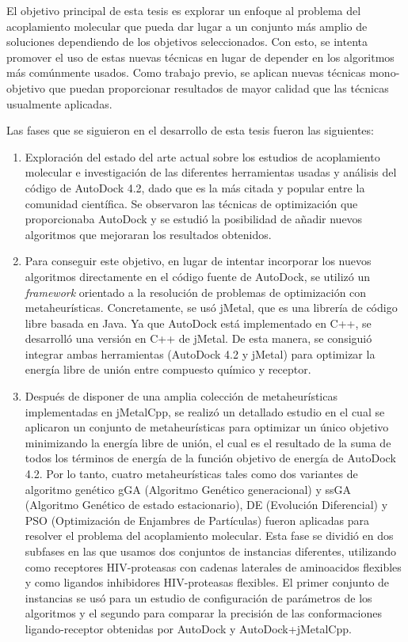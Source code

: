 El objetivo principal de esta tesis es explorar un enfoque al problema del acoplamiento molecular que pueda dar lugar a un conjunto más amplio de soluciones dependiendo de los objetivos seleccionados. Con esto, se intenta promover el uso de estas nuevas técnicas en lugar de depender en los algoritmos más comúnmente usados. Como trabajo previo, se aplican nuevas técnicas mono-objetivo que puedan proporcionar resultados de mayor calidad que las técnicas usualmente aplicadas.

Las fases que se siguieron en el desarrollo de esta tesis fueron las siguientes:

\begin{enumerate}
	
	\item Exploración del estado del arte actual sobre los estudios de acoplamiento molecular e investigación de las diferentes herramientas usadas y análisis del código de AutoDock 4.2, dado que es la más citada y popular entre la comunidad científica. Se observaron las técnicas de optimización que proporcionaba AutoDock y se estudió la posibilidad de añadir nuevos algoritmos que mejoraran los resultados obtenidos.
	
	\item Para conseguir este objetivo, en lugar de intentar incorporar los nuevos algoritmos directamente en el código fuente de AutoDock, se utilizó un \emph{framework} orientado a la resolución de problemas de optimización con metaheurísticas. Concretamente, se usó jMetal, que es una librería de código libre basada en Java. Ya que AutoDock está implementado en C++, se desarrolló una versión en C++ de jMetal. De esta manera, se consiguió integrar ambas herramientas (AutoDock 4.2 y jMetal) para optimizar la energía libre de unión entre compuesto químico y receptor.
	
	\item Después de disponer de una amplia colección de metaheurísticas implementadas en jMetalCpp, se realizó un detallado estudio en el cual se aplicaron un conjunto de metaheurísticas para optimizar un único objetivo minimizando la energía libre de unión, el cual es el resultado de la suma de todos los términos de energía de la función objetivo de energía de AutoDock 4.2. Por lo tanto, cuatro metaheurísticas tales como dos variantes de algoritmo genético gGA (Algoritmo Genético generacional) y ssGA (Algoritmo Genético de estado estacionario), DE (Evolución Diferencial) y PSO (Optimización de Enjambres de Partículas) fueron aplicadas para resolver el problema del acoplamiento molecular. Esta fase se dividió en dos subfases en las que usamos dos conjuntos de instancias diferentes, utilizando como receptores HIV-proteasas con cadenas laterales de aminoacidos flexibles y como ligandos inhibidores HIV-proteasas flexibles. El primer conjunto de instancias se usó para un estudio de configuración de parámetros de los algoritmos y el segundo para comparar la precisión de las conformaciones ligando-receptor obtenidas por AutoDock y AutoDock+jMetalCpp.
	

\end{enumerate}
